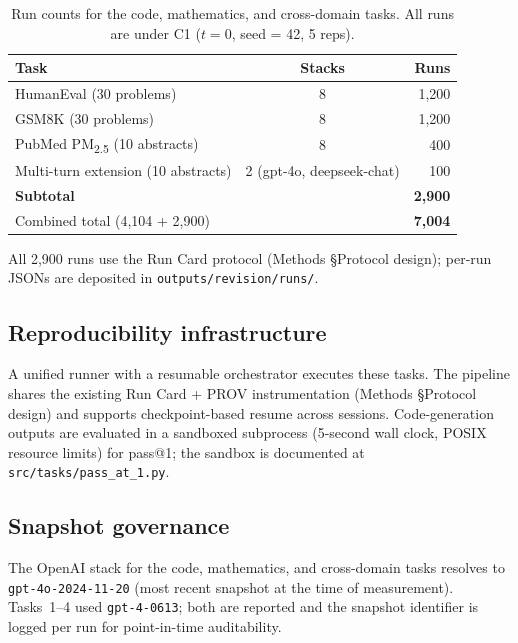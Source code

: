 \documentclass[11pt]{article}
\begin{document}
\begin{table}[H]
\centering
\caption{Run counts for the code, mathematics, and cross-domain tasks. All runs are under C1 ($t = 0$, seed = 42, 5 reps).}
\label{tab:revision-runs}
\small
\begin{tabular}{@{}lcr@{}}
\toprule
\textbf{Task} & \textbf{Stacks} & \textbf{Runs} \\
\midrule
HumanEval (30 problems)       & 8 & 1{,}200 \\
GSM8K (30 problems)           & 8 & 1{,}200 \\
PubMed PM\textsubscript{2.5} (10 abstracts) & 8 & 400 \\
Multi-turn extension (10 abstracts) & 2 (gpt-4o, deepseek-chat) & 100 \\
\midrule
\textbf{Subtotal}             &   & \textbf{2{,}900} \\
\midrule
Combined total (4{,}104 + 2{,}900) & & \textbf{7{,}004} \\
\bottomrule
\end{tabular}
\par\smallskip\raggedright\footnotesize
All 2{,}900 runs use the Run Card protocol (Methods §Protocol design); per-run JSONs are deposited in \texttt{outputs/revision/runs/}.
\end{table}

\subsection{Reproducibility infrastructure}

A unified runner with a resumable orchestrator executes these tasks. The pipeline shares the existing Run Card + PROV instrumentation (Methods §Protocol design) and supports checkpoint-based resume across sessions. Code-generation outputs are evaluated in a sandboxed subprocess (5-second wall clock, POSIX resource limits) for pass@1; the sandbox is documented at \texttt{src/tasks/pass\_at\_1.py}.

\subsection{Snapshot governance}

The OpenAI stack for the code, mathematics, and cross-domain tasks resolves to \texttt{gpt-4o-2024-11-20} (most recent snapshot at the time of measurement). Tasks~1--4 used \texttt{gpt-4-0613}; both are reported and the snapshot identifier is logged per run for point-in-time auditability.
\end{document}
